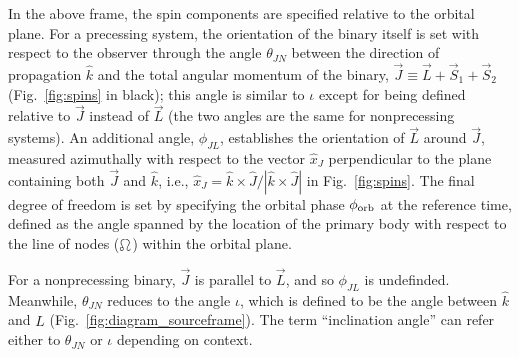 \documentclass[aps,prd,twocolumn,superscriptaddress,preprintnumbers,floatfix,nofootinbib]{revtex4-2}
\begin{document}
In the above frame, the spin components are specified relative to the orbital plane.
For a precessing system, the orientation of the binary itself is set with respect to the observer through the angle $\theta_{JN}$ between the direction of propagation $\hat{k}$ and the total angular momentum of the binary, $\vec{J} \equiv \vec{L} + \vec{S}_1 + \vec{S}_2$ (Fig.~\ref{fig:spins} in black); this angle is similar to $\iota$ except for being defined relative to $\vec{J}$ instead of $\vec{L}$ (the two angles are the same for nonprecessing systems).
An additional angle, $\phi_{JL}$, establishes the orientation of $\vec{L}$ around $\vec{J}$, measured azimuthally with respect to the vector $\hat{x}_J$ perpendicular to the plane containing both $\vec{J}$ and $\hat{k}$, i.e., $\hat{x}_J = \hat{k} \times \hat{J} / |\hat{k} \times \hat{J}|$ in Fig.~\ref{fig:spins}.
The final degree of freedom is set by specifying the orbital phase $\phi_{\rm orb}$ at the reference time, defined as the angle spanned by the location of the primary body with respect to the line of nodes ($\ascnode$) within the orbital plane.

For a nonprecessing binary, $\vec{J}$ is parallel to $\vec{L}$, and so $\phi_{JL}$ is undefinded.
Meanwhile, $\theta_{JN}$ reduces to the angle $\iota$, which is defined to be the angle between $\hat{k}$ and $\hat{L}$ (Fig.~\ref{fig:diagram_sourceframe}).
The term ``inclination angle'' can refer either to $\theta_{JN}$ or $\iota$ depending on context.



\end{document}
